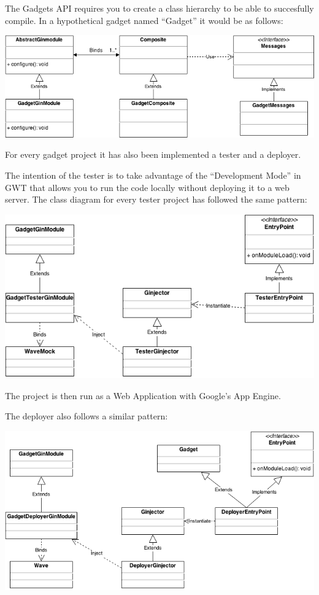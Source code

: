 The Gadgets API requires you to create a class hierarchy to be able to succesfully compile. In a hypothetical gadget named ``Gadget'' it would be as follows:

\begin{center}
\includegraphics[keepaspectratio, scale=0.5]{Media/Diagrams/Gadget/Gadget.png}
\end{center}

For every gadget project it has also been implemented a tester and a deployer.

The intention of the tester is to take advantage of the ``Development Mode'' in GWT that allows you to run the code locally without deploying it to a web server. The class diagram for every tester project has followed the same pattern:

\begin{center}
\includegraphics[keepaspectratio, scale=0.6]{Media/Diagrams/Gadget/Tester.png}
\end{center}

The project is then run as a Web Application with Google's App Engine.

The deployer also follows a similar pattern:

\begin{center}
\includegraphics[keepaspectratio, scale=0.5]{Media/Diagrams/Gadget/Deployer.png}
\end{center}

